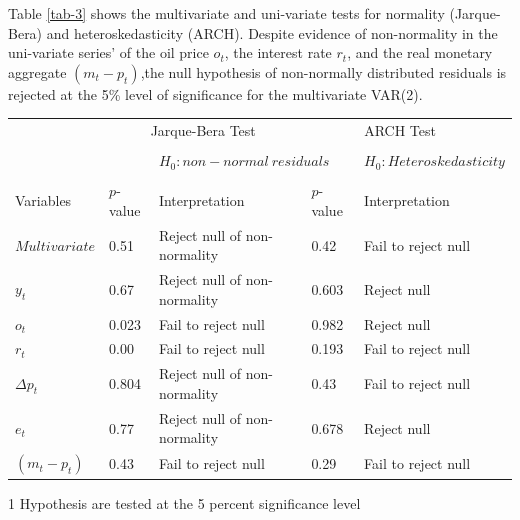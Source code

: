 \documentclass[11pt,preprint, authoryear]{elsarticle}
\let\origtable\table
\let\endorigtable\endtable
\renewenvironment{table}[1][2] {
    \expandafter\origtable\expandafter[H]
} {
    \endorigtable
}
\numberwithin{equation}{section}
\numberwithin{figure}{section}
\numberwithin{table}{section}
\begin{document}
Table \ref{tab-3} shows the multivariate and uni-variate tests for
normality (Jarque-Bera) and heteroskedasticity (ARCH). Despite evidence
of non-normality in the uni-variate series' of the oil price \(o_t\),
the interest rate \(r_t\), and the real monetary aggregate
\((m_t-p_t)\),the null hypothesis of non-normally distributed residuals
is rejected at the 5\% level of significance for the multivariate
VAR(2).

\begin{table}[t]
\caption{Tests for Normality and Homoskedasticity for the unrestricted VAR(2).}
\begin{center}
\begin{threeparttable}[b]
\begin{tabular}{@{}llllll@{}}
\toprule
\multicolumn{1}{l}{}&
\multicolumn{2}{c}{Jarque-Bera Test}&
\multicolumn{2}{c}{ARCH Test}
\\
\cmidrule(l){2-3}
\cmidrule(l){4-5}
\\
\multicolumn{2}{c}{}&
\multicolumn{2}{l}{$H_0:non-normal \ residuals$}&
\multicolumn{2}{l}{$H_0:Heteroskedasticity$}
\\ \\
\multicolumn{1}{l}{Variables}&
\multicolumn{1}{l}{$p$-value\tnote{1}}&
\multicolumn{1}{l}{Interpretation}&
\multicolumn{1}{l}{$p$-value}&
\multicolumn{1}{l}{Interpretation}&
\\   
\midrule    
$Multivariate$ & 0.51 & Reject null of non-normality & 
0.42 & Fail to reject null\\
$y_t$ & 0.67 & Reject null of non-normality & 
 0.603 & Reject null\\
$o_t$ & 0.023 & Fail to reject null & 
 0.982& Reject null\\
$r_t$ & 0.00 & Fail to reject null & 
 0.193 & Fail to reject null\\
$\varDelta{p}_t$ & 0.804 & Reject null of non-normality & 
 0.43 & Fail to reject null\\
$e_t$ & 0.77 & Reject null of non-normality & 
 0.678 & Reject null\\
$(m_t-p_t)$ & 0.43 & Fail to reject null & 
 0.29 & Fail to reject null\\
\bottomrule
\end{tabular}
\begin{tablenotes}
    \item[1] Hypothesis are tested at the 5 percent significance level
  \end{tablenotes}
\end{threeparttable}
\label{tab-3}
\end{center}
\end{table}
\end{document}
